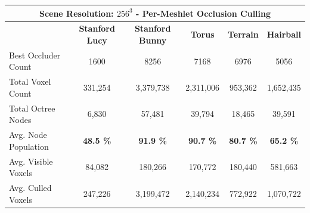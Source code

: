 \begin{table}[!htb]
  \begin{tabular}{|lccccc|}
    \hline
    \multicolumn{6}{|c|}{\textbf{Scene Resolution: $256^3$ - Per-Meshlet Occlusion Culling}}                                                                                                                                                                                        \\ \hline
    \multicolumn{1}{|l|}{}                          & \multicolumn{1}{|c|}{\textbf{Stanford Lucy}}  & \multicolumn{1}{c|}{\textbf{Stanford Bunny}}  & \multicolumn{1}{c|}{\textbf{Torus}}   & \multicolumn{1}{c|}{\textbf{Terrain}}     & \multicolumn{1}{c|}{\textbf{Hairball}}    \\ \hline
    \multicolumn{1}{|l|}{Best Occluder Count}       & \multicolumn{1}{c|}{1600}                     & \multicolumn{1}{c|}{8256}                     & \multicolumn{1}{c|}{7168}             & \multicolumn{1}{c|}{6976}                 & \multicolumn{1}{c|}{5056}                 \\ 
    \multicolumn{1}{|l|}{Total Voxel Count}         & \multicolumn{1}{c|}{331,254}                  & \multicolumn{1}{c|}{3,379,738}                & \multicolumn{1}{c|}{2,311,006}        & \multicolumn{1}{c|}{953,362}              & \multicolumn{1}{c|}{1,652,435}            \\
    \multicolumn{1}{|l|}{Total Octree Nodes}        & \multicolumn{1}{c|}{6,830}                    & \multicolumn{1}{c|}{57,481}                   & \multicolumn{1}{c|}{39,794}           & \multicolumn{1}{c|}{18,465}               & \multicolumn{1}{c|}{39,591}               \\
    \multicolumn{1}{|l|}{Avg. Node Population}      & \multicolumn{1}{c|}{\textbf{48.5 \%}}         & \multicolumn{1}{c|}{\textbf{91.9 \%}}         & \multicolumn{1}{c|}{\textbf{90.7 \%}} & \multicolumn{1}{c|}{\textbf{80.7 \%}}     & \multicolumn{1}{c|}{\textbf{65.2 \%}}     \\ \hline
    \multicolumn{1}{|l|}{Avg. Visible Voxels}       & \multicolumn{1}{c|}{84,082}                   & \multicolumn{1}{c|}{180,266}                  & \multicolumn{1}{c|}{170,772}          & \multicolumn{1}{c|}{180,440}              & \multicolumn{1}{c|}{581,663}              \\
    \multicolumn{1}{|l|}{Avg. Culled Voxels}        & \multicolumn{1}{c|}{247,226}                  & \multicolumn{1}{c|}{3,199,472}                & \multicolumn{1}{c|}{2,140,234}        & \multicolumn{1}{c|}{772,922}              & \multicolumn{1}{c|}{1,070,722}            \\

\end{tabular}
\end{table}
